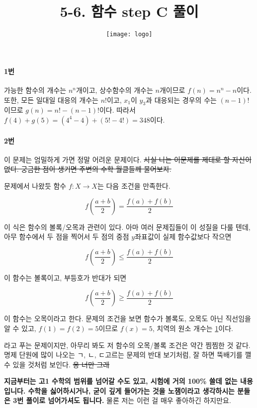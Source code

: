 \documentclass{article}
\title{5-6. 함수 step C 풀이}
\author{
    \texttt{[image: logo]}
}
\date{}
\begin{document}
\maketitle

\paragraph{1번}
가능한 함수의 개수는 $n^n$개이고, 상수함수의 개수는 $n$개이므로 $f(n) = n^n - n$이다. 또한, 모든 일대일 대응의 개수는 $n!$이고, $x_1$이 $y_3$과 대응되는 경우의 수는 $(n - 1)!$이므로 $g(n) = n! - (n - 1)!$이다. 따라서 $f(4) + g(5) = (4^4 - 4) + (5! - 4!) = 348$이다.

\paragraph{2번}
이 문제는 엄밀하게 가면 정말 어려운 문제이다. \sout{사실 나는 이문제를 제대로 할 자신이 없다. 궁금한 점이 생기면 주변의 수학 월클들께 물어보자.} \newline

문제에서 나왔듯 함수 $f: X \longrightarrow X$는 다음 조건을 만족한다.

\[
    f(\frac{a + b}{2}) = \frac{f(a) + f(b)}{2}
\]

이 식은 함수의 볼록/오목과 관련이 있다. 아마 여러 문제집들이 이 성질을 다룰 텐데, 아무 함수에서 두 점을 찍어서 두 점의 중점 $y$좌표값이 실제 함수값보다 작으면

\[
    f(\frac{a + b}{2}) \le \frac{f(a) + f(b)}{2}
\]

이 함수는 볼록이고, 부등호가 반대가 되면

\[
    f(\frac{a + b}{2}) \ge \frac{f(a) + f(b)}{2}
\]

이 함수는 오목이라고 한다. 문제의 조건을 보면 함수가 볼록도, 오목도 아닌 직선임을 알 수 있고, $f(1) = f(2) = 5$이므로 $f(x) = 5$, 치역의 원소 개수는 \underline{1}이다. \newline

라고 푸는 문제이지만, 아무리 봐도 저 함수의 오목/볼록 조건은 약간 찜찜한 것 같다. 명제 단원에 많이 나오는 ㄱ, ㄴ, ㄷ고르는 문제의 반대 보기처럼, 잘 하면 뚝배기를 깰 수 있을 것처럼 보인다. \sout{응 너만 그래} \newline

\textbf{지금부터는 고1 수학의 범위를 넘어갈 수도 있고, 시험에 거의 100\% 쓸데 없는 내용입니다. 수학을 싫어하시거나, 굳이 깊게 들어가는 것을 노잼이라고 생각하시는 분들은 3번 풀이로 넘어가셔도 됩니다.} 물론 저는 이런 걸 매우 좋아하긴 하지만요. \newline
\end{document}
